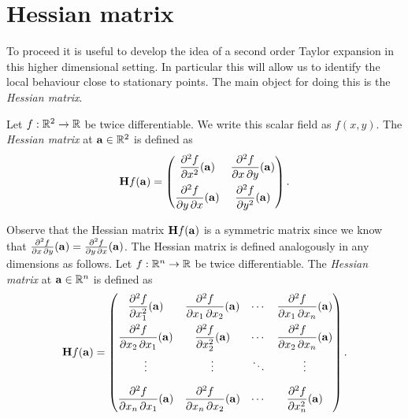 \section{Hessian matrix}

To proceed it is useful to develop the idea of a second order Taylor expansion in this higher dimensional setting.
In particular this will allow us to identify the local behaviour close to stationary points.
The main object for doing this is the \emph{Hessian matrix}.

\begin{definition}
    Let \(f:\bR^2 \to\bR\) be twice differentiable.
    We write this scalar field as \(f(x,y)\).
    The \emph{Hessian matrix} at \(\aa\in \bR^2\) is defined as
    \[
        \mathbf{H} f (\aa)= \begin{pmatrix}
            \dfrac{\partial^2 f}{\partial x^2} (\aa)
             & \dfrac{\partial^2 f}{\partial x\,\partial y} (\aa)
            \\[2.2ex]
            \dfrac{\partial^2 f}{\partial y\,\partial x} (\aa)
             & \dfrac{\partial^2 f}{\partial y^2}(\aa)
        \end{pmatrix}.
    \]
\end{definition}

Observe that the Hessian matrix \(\mathbf{H} f (\aa)\) is a symmetric matrix since we know that \(\frac{\partial^2 f}{\partial x\,\partial y} (\aa) = \frac{\partial^2 f}{\partial y\,\partial x} (\aa)\).
The Hessian matrix is defined analogously in any dimensions as follows.
Let \(f:\bR^n \to\bR\) be twice differentiable.
The \emph{Hessian matrix} at \(\aa\in \bR^n\) is defined as
\[
    \mathbf{H} f (\aa)= \begin{pmatrix}
        \dfrac{\partial^2 f}{\partial x_1^2} (\aa)
         & \dfrac{\partial^2 f}{\partial x_1\,\partial x_2} (\aa)
         & \cdots
         & \dfrac{\partial^2 f}{\partial x_1\,\partial x_n}(\aa)  \\[2.2ex]
        \dfrac{\partial^2 f}{\partial x_2\,\partial x_1} (\aa)
         & \dfrac{\partial^2 f}{\partial x_2^2}(\aa)
         & \cdots
         & \dfrac{\partial^2 f}{\partial x_2\,\partial x_n}(\aa)  \\[2.2ex]
        \vdots
         & \vdots
         & \ddots
         & \vdots                                                 \\[2.2ex]
        \dfrac{\partial^2 f}{\partial x_n\,\partial x_1} (\aa)
         & \dfrac{\partial^2 f}{\partial x_n\,\partial x_2} (\aa)
         & \cdots
         & \dfrac{\partial^2 f}{\partial x_n^2}(\aa)
    \end{pmatrix}.
\]

